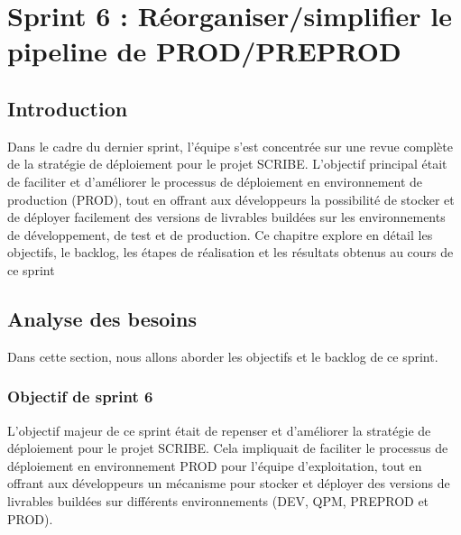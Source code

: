 \chapter{Sprint 6 : Réorganiser/simplifier le pipeline de PROD/PREPROD}
\section{Introduction}
Dans le cadre du dernier sprint, l'équipe s'est concentrée sur une revue complète de la stratégie de déploiement pour le projet SCRIBE. L'objectif principal était de faciliter et d'améliorer le processus de déploiement en environnement de production (PROD), tout en offrant aux développeurs la possibilité de stocker et de déployer facilement des versions de livrables buildées sur les environnements de développement, de test et de production. Ce chapitre explore en détail les objectifs, le backlog, les étapes de réalisation et les résultats obtenus au cours de ce sprint
\section{Analyse des besoins}
Dans cette section, nous allons aborder les objectifs et le backlog de ce sprint.
\subsection{Objectif de sprint 6}
L'objectif majeur de ce sprint était de repenser et d'améliorer la stratégie de déploiement pour le projet SCRIBE. Cela impliquait de faciliter le processus de déploiement en environnement PROD pour l'équipe d'exploitation, tout en offrant aux développeurs un mécanisme pour stocker et déployer des versions de livrables buildées sur différents environnements (DEV, QPM, PREPROD et PROD).

